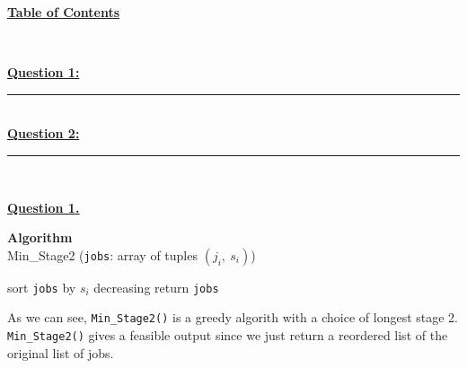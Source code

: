 \documentclass[12pt]{article}
\begin{document}
\begin{center}
	\hypertarget{toc}{\LARGE \underline{\textbf{Table of Contents}}}\\
\end{center}

\hyperlink{1}{\textbf{Question 1:}}
\vspace{1mm}
\hrule
\vspace{1mm} \leavevmode \\

\hyperlink{2}{\textbf{Question 2:}}
\vspace{1mm}
\hrule
\vspace{1mm} \leavevmode \\

\newpage

\hyperlink{toc}{\hypertarget{1}{\LARGE \underline{\textbf{Question 1.}}}}\\
\begin{algorithm}
	\caption*{\textbf{Algorithm}\\Min\_Stage2 \big(\texttt{jobs}: array of tuples $(j_i,\ s_i)$\big)}\label{alg:cap}
	\begin{algorithmic}[1]
		\State sort \texttt{jobs} by $s_i$ decreasing
		\State return \texttt{jobs}
	\end{algorithmic}
\end{algorithm}

As we can see, \texttt{Min\_Stage2()} is a greedy algorith with a choice of longest stage 2.
\texttt{Min\_Stage2()} gives a feasible output since we just return a reordered list of the original list of jobs.\\
\end{document}
